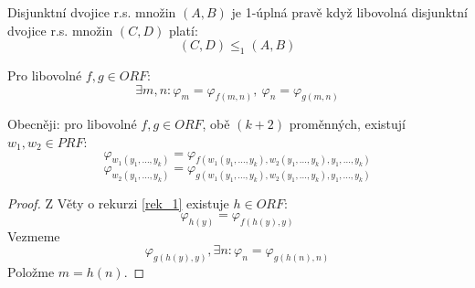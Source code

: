 \begin{definition}
	Disjunktní dvojice r.s. množin $(A, B)$ je 1-úplná pravě když libovolná disjunktní dvojice r.s. množin $(C, D)$ platí:
	\[ (C, D) \leq_1 (A, B) \]
\end{definition}

\begin{theorem}\label{rek_2x}
	Pro libovolné $f, g \in ORF$:
	\[ \exists m, n: \varphi_m = \varphi_{f(m, n)},\ \varphi_n = \varphi_{g(m, n)} \]

	Obecněji: pro libovolné $f, g \in ORF$, obě $(k + 2)$ proměnných, existují $w_1, w_2 \in PRF$:
	\[ \varphi_{w_1(y_1, \ldots, y_k)} = \varphi_{f(w_1(y_1, \ldots, y_k), w_2(y_1, \ldots, y_k), y_1, \ldots, y_k)} \]
	\[ \varphi_{w_2(y_1, \ldots, y_k)} = \varphi_{g(w_1(y_1, \ldots, y_k), w_2(y_1, \ldots, y_k), y_1, \ldots, y_k)} \]
\end{theorem}
\begin{proof}
	Z Věty o rekurzi \cref{rek_1} existuje $h \in ORF$:
	\[ \varphi_{h(y)} = \varphi_{f(h(y), y)} \]
	Vezmeme
	\[ \varphi_{g(h(y), y)}, \exists n: \varphi_n = \varphi_{g(h(n), n)} \]
	Položme $m = h(n)$.
\end{proof}

